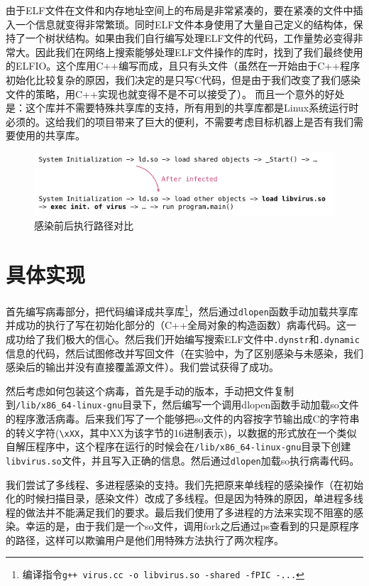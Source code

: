 \documentclass[a4paper, 11pt]{article}
\begin{document}
由于ELF文件在文件和内存地址空间上的布局是非常紧凑的，要在紧凑的文件中插入一个信息就变得非常繁琐。同时ELF文件本身使用了大量自己定义的结构体，保持了一个树状结构。如果由我们自行编写处理ELF文件的代码，工作量势必变得非常大。因此我们在网络上搜索能够处理ELF文件操作的库时，找到了我们最终使用的ELFIO。这个库用C++编写而成，且只有头文件（虽然在一开始由于C++程序初始化比较复杂的原因，我们决定的是只写C代码，但是由于我们改变了我们感染文件的策略，用C++实现也就变得不是不可以接受了）。 而且一个意外的好处是：这个库并不需要特殊共享库的支持，所有用到的共享库都是Linux系统运行时必须的。这给我们的项目带来了巨大的便利，不需要考虑目标机器上是否有我们需要使用的共享库。


\begin{figure}[htbp]
		\centering
		\includegraphics[width = \textwidth]{figures/fig5_ld2}
		\caption{感染前后执行路径对比}
		\label{fig:way4}
\end{figure}

\section{具体实现}
首先编写病毒部分，把代码编译成共享库\footnote{编译指令\texttt{g++ virus.cc -o libvirus.so -shared -fPIC -...}}，然后通过\texttt{dlopen}函数手动加载共享库并成功的执行了写在初始化部分的（C++全局对象的构造函数）病毒代码。这一成功给了我们极大的信心。然后我们开始编写搜索ELF文件中\texttt{.dynstr}和\texttt{.dynamic}信息的代码，然后试图修改并写回文件（在实验中，为了区别感染与未感染，我们感染后的输出并没有直接覆盖源文件）。我们尝试获得了成功。

然后考虑如何包装这个病毒，首先是手动的版本，手动把文件复制到\texttt{/lib/x86\_64-linux-gnu}目录下，然后编写一个调用dlopen函数手动加载so文件的程序激活病毒。后来我们写了一个能够把so文件的内容按字节输出成C的字符串的转义字符(\texttt{\textbackslash xXX}，其中XX为该字节的16进制表示)，以数据的形式放在一个类似自解压程序中，这个程序在运行的时候会在\texttt{/lib/x86\_64-linux-gnu}目录下创建\texttt{libvirus.so}文件，并且写入正确的信息。然后通过\texttt{dlopen}加载so执行病毒代码。

我们尝试了多线程、多进程感染的支持。我们先把原来单线程的感染操作（在初始化的时候扫描目录，感染文件）改成了多线程。但是因为特殊的原因，单进程多线程的做法并不能满足我们的要求。最后我们使用了多进程的方法来实现不阻塞的感染。幸运的是，由于我们是一个so文件，调用fork之后通过ps查看到的只是原程序的路径，这样可以欺骗用户是他们用特殊方法执行了两次程序。
\end{document}
